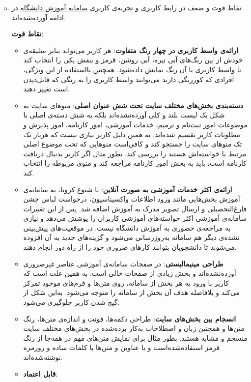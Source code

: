 {\begin{enumerate}[a)]
درنهایت باید تاکید کرد که رابط کاربری و تجربه‌ی کاربری مکمل یکدیگر هستند و هردو برای تولید یک محصول رضایت‌بخش ضروری‌اند و نمی‌توان یکی را به دیگری برتری داد.
	\item 
	نقاط قوت و  ضعف در رابط کاربری و تجربه‌ی کاربری
\href{https://edu.sharif.edu/}{سامانه آموزش دانشگاه}
در ادامه آورده‌شده‌اند.

 \textbf{نقاط قوت}:
\begin{itemize}
\item \textbf{ارائه‌ی واسط کاربری در چهار رنگ متفاوت}:
هر کاربر می‌تواند بنابر سلیقه‌ی خودش از بین رنگ‌های آبی تیره، آبی روشن، قرمز و بنفش یکی را انتخاب کند تا واسط کاربری با آن رنگ نمایش داده‌شود. همچنین بااستفاده از این ویژگی، افرادی که کوررنگی دارند می‌توانند واسط کاربری را به رنگی که قابل‌دیدن است تغییر دهند.
\item \textbf{دسته‌بندی بخش‌های مختلف سایت تحت شش عنوان اصلی}:
منوهای سایت به شکل یک لیست بلند و کلی آورده‌نشده‌اند بلکه به شش دسته‌ی اصلی با موضوعات امور ثبت‌نام و ترمیم، خدمات آموزشی، امور کارنامه، امور پذیرش و مطلوبات کاربر تقسیم شده‌اند. به همین دلیل کاربر نیازی نیست که هربار تک تک منوهای سایت را جستجو کند و  کافی‌است منوهایی که تحت موضوع اصلی مرتبط با خواسته‌اش هستند را بررسی کند. بطور مثال اگر کاربر بدنبال دریافت کارنامه است، باید به بخش امور کارنامه مراجعه کند و منوی مربوطه را انتخاب کند.
\item \textbf{ارائه‌ی اکثر خدمات آموزشی به صورت آنلاین}:
با شیوع کرونا، به سامانه‌ی آموزش بخش‌هایی مانند ورود اطلاعات واکسیناسیون، درخواست لباس جشن فارغ‌التحصیلی و ارسال تصویر مدرک به آموزش اضافه شد. پس از این تغییرات سامانه‌ی آموزشی اکثر خواسته‌های آموزشی کاربران را پوشش می‌دهد و نیازی به مراجعه‌ی حضوری به آموزش دانشگاه نیست. در موقعیت‌های پیش‌بینی نشده‌ی دیگر هم سامانه به‌روزرسانی می‌شود و گزینه‌های جدید به آن افزوده می‌شوند تا دانشجویان بتوانند کارهای ضروری خود را از راه دور انجام دهند.
\item \textbf{طراحی مینیمالیستی}:
در صفحات سامانه‌ی آموزشی عناصر غیرضروری آورده‌نشده‌اند و بخش زیادی از صفحات خالی است. به همین علت است که کاربر با ورود به هر بخش از سامانه، روی متن‌ها و فرم‌های موجود تمرکز می‌کند و بلافاصله هدف آن بخش از سامانه را متوجه می‌شود. به‌این شکل از گیج شدن کاربر جلوگیری می‌شود.
\item \textbf{انسجام بین بخش‌های سایت}:
طراحی دکمه‌ها، فونت و اندازه‌ی متن‌ها، رنگ متن‌ها و همچنین زبان و اصطلاحات به‌کار برده‌شده در بخش‌های مختلف سایت منسجم و مشابه هستند. بطور مثال برای نمایش متن‌های مهم در همه‌جا از رنگ قرمز استفاده‌شده‌است و یا عناوین و متن‌ها با کلمات ساده و روزمره نوشته‌شده‌اند.
\item \textbf{قابل اعتماد}:

\end{itemize}
\end{enumerate}}
